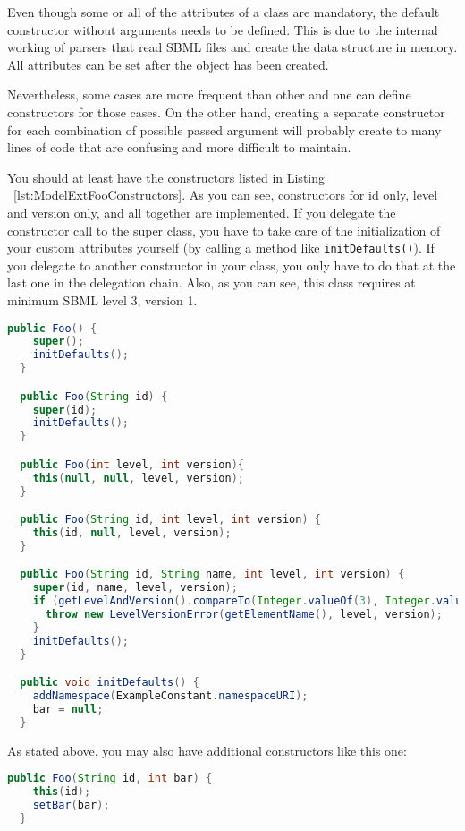 Even though some or all of the attributes of a class are mandatory, the default constructor without arguments needs to be defined.
This is due to the internal working of parsers that read SBML files and create the data structure in memory.
All attributes can be set after the object has been created.

Nevertheless, some cases are more frequent than other and one can define constructors for those cases.
On the other hand, creating a separate constructor for each combination of possible passed argument will probably create to many lines of code
that are confusing and more difficult to maintain.

You should at least have the constructors listed in Listing ~\vref{lst:ModelExtFooConstructors}.
As you can see, constructors for id only, level and version only, and all together are implemented.
If you delegate the constructor call to the super class, you have to take care of the initialization of your custom attributes yourself (by calling a method like \texttt{initDefaults()}).
If you delegate to another constructor in your class, you only have to do that at the last one in the delegation chain.
Also, as you can see, this class requires at minimum SBML level 3, version 1.

\begin{lstlisting}[language=Java,caption={Constructors for \texttt{Foo}},label={lst:ModelExtFooConstructors}]
  public Foo() {
    super();
    initDefaults();
  }

  public Foo(String id) {
    super(id);
    initDefaults();
  }

  public Foo(int level, int version){
    this(null, null, level, version);
  }

  public Foo(String id, int level, int version) {
    this(id, null, level, version);
  }

  public Foo(String id, String name, int level, int version) {
    super(id, name, level, version);
    if (getLevelAndVersion().compareTo(Integer.valueOf(3), Integer.valueOf(1)) < 0) {
      throw new LevelVersionError(getElementName(), level, version);
    }
    initDefaults();
  }

  public void initDefaults() {
    addNamespace(ExampleConstant.namespaceURI);
    bar = null;
  }
\end{lstlisting}

As stated above, you may also have additional constructors like this one:
\begin{lstlisting}[language=Java,caption={Additional constructor for \texttt{Foo}},label={lst:ModelExtFooConstructorsAdditional}]
  public Foo(String id, int bar) {
    this(id);
    setBar(bar);
  }
\end{lstlisting}



